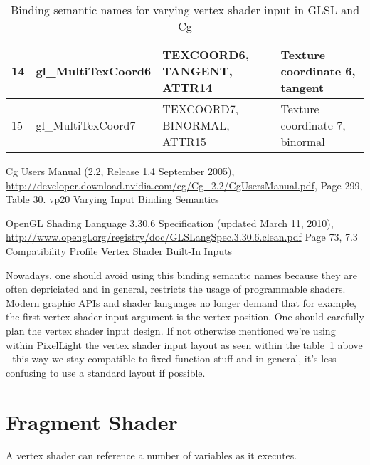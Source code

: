 \begin{table}[htb]
\begin{ThreePartTable}
\begin{tabular}{|l|l|p{}|l|}
				\hline
				14	&	gl\_MultiTexCoord6	&	TEXCOORD6, TANGENT, ATTR14	&	Texture coordinate 6, tangent\\
				\hline
				15	&	gl\_MultiTexCoord7	&	TEXCOORD7, BINORMAL, ATTR15	&	Texture coordinate 7, binormal\\
				\hline
			\bottomrule
		\end{tabular}
		\begin{tablenotes}
			\item[1] Cg Users Manual (2.2, Release 1.4 September 2005), \url{http://developer.download.nvidia.com/cg/Cg\_2.2/CgUsersManual.pdf}, Page 299, Table 30. vp20 Varying Input Binding Semantics
			\item[2] \ac{OpenGL} Shading Language 3.30.6 Specification (updated March 11, 2010), \url{http://www.opengl.org/registry/doc/GLSLangSpec.3.30.6.clean.pdf} Page 73, 7.3 Compatibility Profile Vertex Shader Built-In Inputs
		\end{tablenotes}
		\caption{Binding semantic names for varying vertex shader input in \ac{GLSL} and Cg}
		\label{Table:VaryingVertexShaderInput}
	\end{ThreePartTable}
\end{table}
Nowadays, one should avoid using this binding semantic names because they are often depriciated and in general, restricts the usage of programmable shaders. Modern graphic \ac{API}s and shader languages no longer demand that for example, the first vertex shader input argument is the vertex position. One should carefully plan the vertex shader input design. If not otherwise mentioned we're using within PixelLight the vertex shader input layout as seen within the table~\ref{Table:VaryingVertexShaderInput} above - this way we stay compatible to fixed function stuff and in general, it's less confusing to use a standard layout if possible.




\section{Fragment Shader}
A vertex shader can reference a number of variables as it executes.
